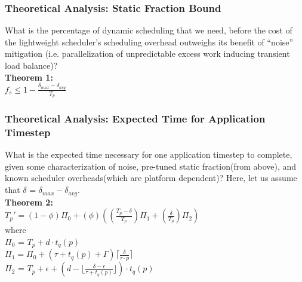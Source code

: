\begin{frame}
\frametitle{Theoretical Analysis: Static Fraction Bound}

What is the percentage of dynamic scheduling that we need, before the
cost of the lightweight scheduler's scheduling overhead outweighs its
benefit of ``noise'' mitigation (i.e. parallelization of unpredictable
excess work inducing transient load balance)? \\

\textbf{Theorem 1:} \\
 $f_{s} \leq 1 - \frac{{\delta}_{max} -{\delta}_{avg}}{T_{p}}$ \\ 
\end{frame} 

\begin{frame}
\frametitle{Theoretical Analysis: Expected Time for Application Timestep}

What is the expected time necessary for one application timestep to
complete, given some characterization of noise, pre-tuned static
fraction(from above), and known scheduler overheads(which are platform
dependent)?  Here, let us assume that $\delta$ = $\delta_{max} -
\delta_{avg} $. \\

\textbf{Theorem 2:} \\ 
 $ T_{p}' = (1 - {\phi}){\Pi}_0 + (\phi)((\frac{T_p -\delta}{T_p}){\Pi}_1 + (\frac{\delta}{T_p}){\Pi}_2) $ \\ 

where \\  
${\Pi}_0$ = $T_p + d \cdot {t_q}(p)$ \\  
${\Pi}_1 = {\Pi}_0 + (\tau + {t_q}(p) + \Gamma) \lceil \frac{\delta}{\tau \cdot p} \rceil $ \\
${\Pi}_2$ =  $T_p + \epsilon + (d - \lfloor \frac{\delta - \epsilon}{\tau + {t_q}(p)} \rfloor) \cdot {t_q}(p)$ \\ 

\end{frame}  


